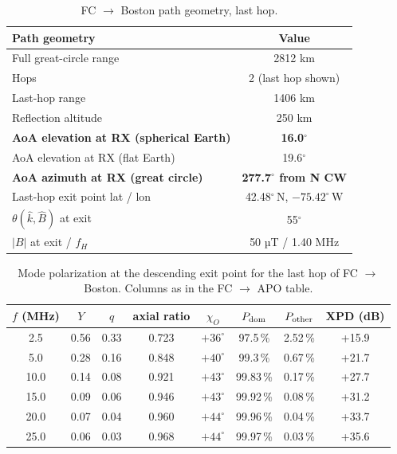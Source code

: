 \documentclass[11pt]{article}
\begin{document}
\begin{table}[h]\centering
\begin{tabular}{lc}
\toprule
\textbf{Path geometry} & \textbf{Value} \\\midrule
Full great-circle range          & 2812 km            \\
Hops                             & 2 (last hop shown) \\
Last-hop range                   & 1406 km            \\
Reflection altitude              & 250 km             \\
\textbf{AoA elevation at RX (spherical Earth)} & \textbf{16.0$^\circ$} \\
AoA elevation at RX (flat Earth)               & 19.6$^\circ$ \\
\textbf{AoA azimuth at RX (great circle)}      & \textbf{277.7$^\circ$ from N CW} \\
Last-hop exit point lat / lon    & 42.48$^\circ$\,N, $-75.42^\circ$\,W \\
$\theta(\hat k, \hat B)$ at exit & 55$^\circ$         \\
$|B|$ at exit / $f_H$            & 50 µT / 1.40 MHz   \\\bottomrule
\end{tabular}
\caption{FC $\to$ Boston path geometry, last hop.}
\end{table}

\begin{table}[h]\centering
\small
\begin{tabular}{cccccccc}
\toprule
$f$ (MHz) & $Y$ & $q$ & axial ratio & $\chi_O$ & $P_{\rm dom}$ & $P_{\rm other}$ & XPD (dB) \\
\midrule
 2.5  & 0.56 & 0.33 & 0.723 & $+36^\circ$ & 97.5\,\%  & 2.52\,\%   & +15.9 \\
 5.0  & 0.28 & 0.16 & 0.848 & $+40^\circ$ & 99.3\,\%  & 0.67\,\%   & +21.7 \\
10.0  & 0.14 & 0.08 & 0.921 & $+43^\circ$ & 99.83\,\% & 0.17\,\%   & +27.7 \\
15.0  & 0.09 & 0.06 & 0.946 & $+43^\circ$ & 99.92\,\% & 0.08\,\%   & +31.2 \\
20.0  & 0.07 & 0.04 & 0.960 & $+44^\circ$ & 99.96\,\% & 0.04\,\%   & +33.7 \\
25.0  & 0.06 & 0.03 & 0.968 & $+44^\circ$ & 99.97\,\% & 0.03\,\%   & +35.6 \\
\bottomrule
\end{tabular}
\caption{Mode polarization at the descending exit point for the last
hop of FC $\to$ Boston.  Columns as in the FC $\to$ APO table.}
\end{table}
\end{document}
